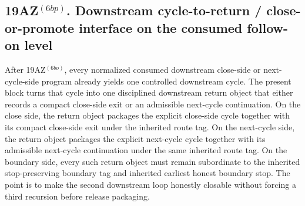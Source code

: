 \subsection*{19AZ$^{(6bp)}$. Downstream cycle-to-return / close-or-promote interface on the consumed follow-on level}
\label{sec:first-downstream-cycle-to-return-close-or-promote-interface-extracted-from-the-downstream-program-to-cycle-layer-on-the-consumed-follow-on-level}
After 19AZ$^{(6bo)}$, every normalized consumed downstream close-side or next-cycle-side program already yields one controlled downstream cycle. The present block turns that cycle into one disciplined downstream return object that either records a compact close-side exit or an admissible next-cycle continuation. On the close side, the return object packages the explicit close-side cycle together with its compact close-side exit under the inherited route tag. On the next-cycle side, the return object packages the explicit next-cycle cycle together with its admissible next-cycle continuation under the same inherited route tag. On the boundary side, every such return object must remain subordinate to the inherited stop-preserving boundary tag and inherited earliest honest boundary stop. The point is to make the second downstream loop honestly closable without forcing a third recursion before release packaging.

